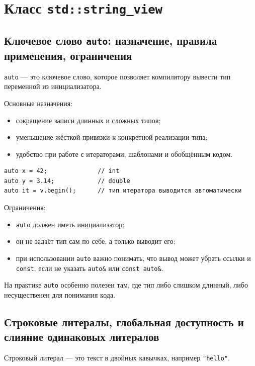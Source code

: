 \section{Класс \texttt{std::string\_view}}

\subsection{Ключевое слово \texttt{auto}: назначение, правила применения, ограничения}
\begin{definition}
\texttt{auto} — это ключевое слово, которое позволяет компилятору вывести тип переменной из инициализатора.
\end{definition}

Основные назначения:
\begin{itemize}
    \item сокращение записи длинных и сложных типов;
    \item уменьшение жёсткой привязки к конкретной реализации типа;
    \item удобство при работе с итераторами, шаблонами и обобщённым кодом.
\end{itemize}

\begin{example}
\begin{verbatim}
auto x = 42;              // int
auto y = 3.14;            // double
auto it = v.begin();      // тип итератора выводится автоматически
\end{verbatim}
\end{example}

Ограничения:
\begin{itemize}
    \item \texttt{auto} должен иметь инициализатор;
    \item он не задаёт тип сам по себе, а только выводит его;
    \item при использовании \texttt{auto} важно понимать, что вывод может убрать ссылки и \texttt{const}, если не указать \texttt{auto\&} или \texttt{const auto\&}.
\end{itemize}

\begin{remark}
На практике \texttt{auto} особенно полезен там, где тип либо слишком длинный, либо несущественен для понимания кода.
\end{remark}

\subsection{Строковые литералы, глобальная доступность и слияние одинаковых литералов}
\begin{definition}
Строковый литерал — это текст в двойных кавычках, например \texttt{"hello"}.
\end{definition}

